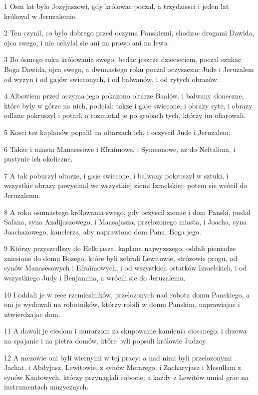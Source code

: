 \par 1 Osm lat bylo Jozyjaszowi, gdy królowac poczal, a trzydziesci i jeden lat królowal w Jeruzalemie.
\par 2 Ten czynil, co bylo dobrego przed oczyma Panskiemi, chodzac drogami Dawida, ojca swego, i nie uchylal sie ani na prawo ani na lewo.
\par 3 Bo ósmego roku królowania swego, bedac jeszcze dziecieciem, poczal szukac Boga Dawida, ojca swego, a dwunastego roku poczal oczyszczac Jude i Jeruzalem od wyzyn i od gajów swieconych, i od balwanów, i od rytych obrazów.
\par 4 Albowiem przed oczyma jego pokazono oltarze Baalów, i balwany sloneczne, które byly w górze na nich, podcial: takze i gaje swiecone, i obrazy ryte, i obrazy odlane pokruszyl i potarl, a rozmiotal je po grobach tych, którzy im ofiarowali.
\par 5 Kosci tez kaplanów popalil na oltarzach ich, i oczyscil Jude i Jeruzalem;
\par 6 Takze i miasta Manasesowe i Efraimowe, i Symeonowe, az do Neftalima, i pustynie ich okoliczne.
\par 7 A tak poburzyl oltarze, i gaje swiecone, i balwany pokruszyl w sztuki, i wszystkie obrazy powycinal we wszystkiej ziemi Izraelskiej; potem sie wrócil do Jeruzalemu.
\par 8 A roku osmnastego królowania swego, gdy oczyscil ziemie i dom Panski, poslal Safana, syna Azalijaszowego, i Maasajasza, przelozonego miasta, i Joacha, syna Joachazowego, kanclerza, aby naprawiono dom Pana, Boga jego.
\par 9 Którzy przyszedlszy do Helkijasza, kaplana najwyzszego, oddali pieniadze zniesione do domu Bozego, które byli zebrali Lewitowie, strózowie progu, od synów Manasesowych i Efraimowych, i od wszystkich ostatków Izraelskich, i od wszystkiego Judy i Benjamina, a wrócili sie do Jeruzalemu.
\par 10 I oddali je w rece rzemieslników, przelozonych nad robota domu Panskiego, a oni je wydawali na robotników, którzy robili w domu Panskim, naprawiajac i utwierdzajac dom.
\par 11 A dawali je cieslom i murarzom za skupowanie kamienia ciosanego, i drzewa na spajanie i na pietra domów, które byli popsuli królowie Judzcy.
\par 12 A mezowie oni byli wiernymi w tej pracy: a nad nimi byli przelozonymi Jachat, i Abdyjasz, Lewitowie, z synów Merarego, i Zacharyjasz i Mesullam z synów Kaatowych, którzy przynaglali robocie; a kazdy z Lewitów umial grac na instrumentach muzycznych.
